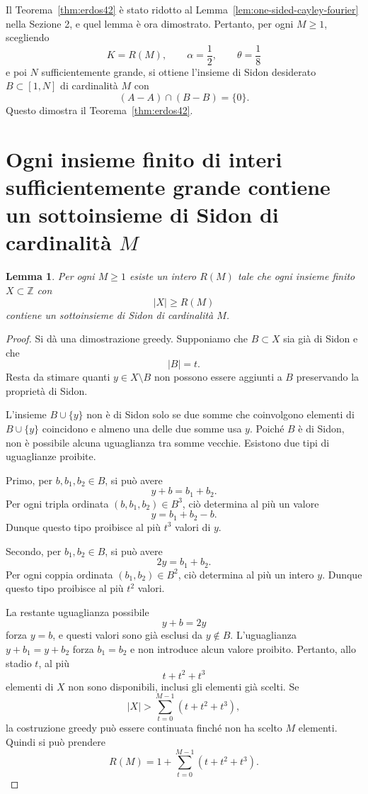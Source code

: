 \documentclass[11pt]{article}
\numberwithin{equation}{section}
\newtheorem{lemma}[theorem]{Lemma}
\newcommand{\Z}{\mathbb Z}
\newcommand{\1}{\mathbf 1}
\begin{document}
Il Teorema~\ref{thm:erdos42} è stato ridotto al Lemma~\ref{lem:one-sided-cayley-fourier} nella Sezione 2, e quel lemma è ora dimostrato. Pertanto, per ogni \(M\ge1\), scegliendo
\[
        K=R(M),\qquad \alpha=\frac12,
        \qquad \theta=\frac18
\]
e poi \(N\) sufficientemente grande, si ottiene l'insieme di Sidon desiderato \(B\subset[1,N]\) di cardinalità \(M\) con
\[
        (A-A)\cap(B-B)=\{0\}.
\]
Questo dimostra il Teorema~\ref{thm:erdos42}.

\appendix

\section{Ogni insieme finito di interi sufficientemente grande contiene un sottoinsieme di Sidon di cardinalità \texorpdfstring{\(M\)}{M}}
\label{app:sidon-subsets}

\begin{lemma}
\label{lem:large-set-sidon-subset}
Per ogni \(M\ge1\) esiste un intero \(R(M)\) tale che ogni insieme finito \(X\subset\Z\) con
\[
        |X|\ge R(M)
\]
contiene un sottoinsieme di Sidon di cardinalità \(M\).
\end{lemma}

\begin{proof}
Si dà una dimostrazione greedy. Supponiamo che \(B\subset X\) sia già di Sidon e che
\[
        |B|=t.
\]
Resta da stimare quanti \(y\in X\setminus B\) non possono essere aggiunti a \(B\) preservando la proprietà di Sidon.

L'insieme \(B\cup\{y\}\) non è di Sidon solo se due somme che coinvolgono elementi di \(B\cup\{y\}\) coincidono e almeno una delle due somme usa \(y\). Poiché \(B\) è di Sidon, non è possibile alcuna uguaglianza tra somme vecchie. Esistono due tipi di uguaglianze proibite.

Primo, per \(b,b_1,b_2\in B\), si può avere
\[
        y+b=b_1+b_2.
\]
Per ogni tripla ordinata \((b,b_1,b_2)\in B^3\), ciò determina al più un valore
\[
        y=b_1+b_2-b.
\]
Dunque questo tipo proibisce al più \(t^3\) valori di \(y\).

Secondo, per \(b_1,b_2\in B\), si può avere
\[
        2y=b_1+b_2.
\]
Per ogni coppia ordinata \((b_1,b_2)\in B^2\), ciò determina al più un intero \(y\). Dunque questo tipo proibisce al più \(t^2\) valori.

La restante uguaglianza possibile
\[
        y+b=2y
\]
forza \(y=b\), e questi valori sono già esclusi da \(y\notin B\). L'uguaglianza \(y+b_1=y+b_2\) forza \(b_1=b_2\) e non introduce alcun valore proibito. Pertanto, allo stadio \(t\), al più
\[
        t+t^2+t^3
\]
elementi di \(X\) non sono disponibili, inclusi gli elementi già scelti. Se
\[
        |X|>\sum_{t=0}^{M-1}(t+t^2+t^3),
\]
la costruzione greedy può essere continuata finché non ha scelto \(M\) elementi. Quindi si può prendere
\[
        R(M)=1+\sum_{t=0}^{M-1}(t+t^2+t^3).
\]
\end{proof}
\end{document}
